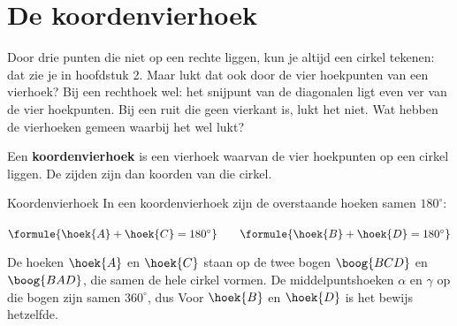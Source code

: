 \section{De koordenvierhoek}

Door drie punten die niet op een rechte liggen, kun je altijd een cirkel tekenen: dat zie je in hoofdstuk 2. Maar lukt dat ook door de vier hoekpunten van een vierhoek? Bij een rechthoek wel: het snijpunt van de diagonalen ligt even ver van de vier hoekpunten. Bij een ruit die geen vierkant is, lukt het niet. Wat hebben de vierhoeken gemeen waarbij het wel lukt?

\begin{theorie}
\begin{minipage}[t]{.64\linewidth}
\vspace{0pt}
Een \textbf{\textcolor{accent}{koordenvierhoek}} is een vierhoek waarvan de vier hoekpunten op een cirkel liggen. De zijden zijn dan koorden van die cirkel.

\begin{stelling}{Koordenvierhoek}
In een koordenvierhoek zijn de overstaande hoeken samen $180^\circ$:

\vspace{1mm}
\qquad $\formule{\hoek{A} + \hoek{C} = 180^\circ} \qquad \formule{\hoek{B} + \hoek{D} = 180^\circ}$
\end{stelling}

\begin{bewijs}
De hoeken $\hoek{A}$ en $\hoek{C}$ staan op de twee bogen $\boog{BCD}$ en $\boog{BAD}$, die samen de hele cirkel vormen. De middelpuntshoeken $\alpha$ en $\gamma$ op die bogen zijn samen $360^\circ$, dus
Voor $\hoek{B}$ en $\hoek{D}$ is het bewijs hetzelfde.
\end{bewijs}
\end{minipage}\hfill
\begin{minipage}[t]{.32\linewidth}
\vspace{0pt}
\centering
{}
\end{minipage}
\end{theorie}

